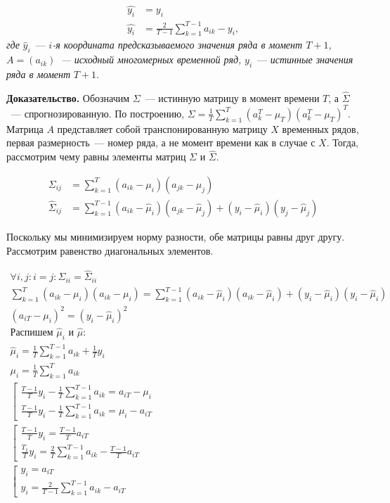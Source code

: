 \documentclass{article}
\begin{document}
\begin{align*}
	\hat{y_i} &= y_i\\
	\hat{y_i} &= \frac{2}{T-1} \sum_{k=1}^{T-1} a_{ik} - y_i,
\end{align*}
\textit{где} $\hat{y}_i$~--- $i$\textit{-я координата предсказываемого значения ряда в момент $T+1$, $A=(a_{ik})$~--- исходный многомерных временной ряд,} $y_i$~--- \textit{истинные значения ряда в момент} $T+1$.

\textbf{Доказательство.} Обозначим $\Sigma$~--- истинную матрицу в момент времени $T$, а $\hat{\Sigma}$~--- спрогнозированную. По построению, ${\Sigma} = \frac{1}{T} \sum_{k=1}^{T} (a^T_k - \mu_T)(a^T_k - \mu_T)^T$. Матрица $A$ представляет собой транспонированную матрицу $X$ временных рядов, первая размерность~--- номер ряда, а не момент времени как в случае с $X$. Тогда, рассмотрим чему равны элементы матриц $\Sigma$ и $\hat{\Sigma}$.

\begin{align*}
	\Sigma_{ij} &= \sum_{k=1}^{T}(a_{ik} - \mu_i)(a_{jk}-\mu_j)\\
	\hat{\Sigma}_{ij} &= \sum_{k=1}^{T-1}(a_{ik} - \hat{\mu}_i)(a_{jk}-\hat{\mu}_j) + (y_i - \hat{\mu}_i)(y_j - \hat{\mu}_j)
\end{align*}

Поскольку мы минимизируем норму разности, обе матрицы равны друг другу. Рассмотрим равенство диагональных элементов.

\begin{gather*}
	\forall i, j: i = j: \Sigma_{ii} = \hat{\Sigma}_{ii}\\
	\sum_{k=1}^{T}(a_{ik} - \mu_i)(a_{ik}-\mu_i) = \sum_{k=1}^{T-1}(a_{ik} - \hat{\mu}_i)(a_{ik}-\hat{\mu}_i) + (y_i - \hat{\mu}_i)(y_i - \hat{\mu}_i)\\
	(a_{iT}-\mu_i)^2 = (y_i-\hat{\mu}_i)^2\\
	\text{Распишем } \hat{\mu}_i \text{ и } \hat{\mu}:\\
	\hat{\mu}_i = \frac{1}{T}\sum_{k=1}^{T-1}a_{ik} + \frac{1}{T}y_i\\
	\mu_i = \frac{1}{T}\sum_{k=1}^{T}a_{ik}\\
	\left[
	\begin{array}{ll}
		\frac{T-1}{T}y_i-\frac{1}{T}\sum_{k=1}^{T-1}a_{ik}=a_{iT}-\mu_i
		\\[1ex]
		\frac{T-1}{T}y_i-\frac{1}{T}\sum_{k=1}^{T-1}a_{ik}=\mu_i-a_{iT}
	\end{array}
	\right .\\[1ex]
	\left[
	\begin{array}{ll}
		\frac{T-1}{T}y_i = \frac{T-1}{T}a_{iT}
		\\[1ex]
		\frac{T_1}{T}y_i = \frac{2}{T} \sum_{k=1}^{T-1} a_{ik} - \frac{T-1}{T}a_{iT}
	\end{array}
	\right .\\[1ex]
	\left[
	\begin{array}{ll}
		y_i = a_{iT}
		\\[1ex]
		y_i = \frac{2}{T-1} \sum_{k=1}^{T-1} a_{ik} - a_{iT}
	\end{array}
	\right .
\end{gather*}
\end{document}
